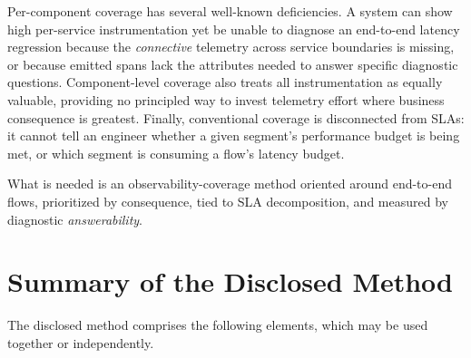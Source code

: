 \documentclass[11pt]{article}
\begin{document}
Per-component coverage has several well-known deficiencies. A system can show high per-service instrumentation yet be unable to diagnose an end-to-end latency regression because the \emph{connective} telemetry across service boundaries is missing, or because emitted spans lack the attributes needed to answer specific diagnostic questions. Component-level coverage also treats all instrumentation as equally valuable, providing no principled way to invest telemetry effort where business consequence is greatest. Finally, conventional coverage is disconnected from SLAs: it cannot tell an engineer whether a given segment's performance budget is being met, or which segment is consuming a flow's latency budget.

What is needed is an observability-coverage method oriented around end-to-end flows, prioritized by consequence, tied to SLA decomposition, and measured by diagnostic \emph{answerability}.

\section{Summary of the Disclosed Method}
The disclosed method comprises the following elements, which may be used together or independently.
\end{document}
